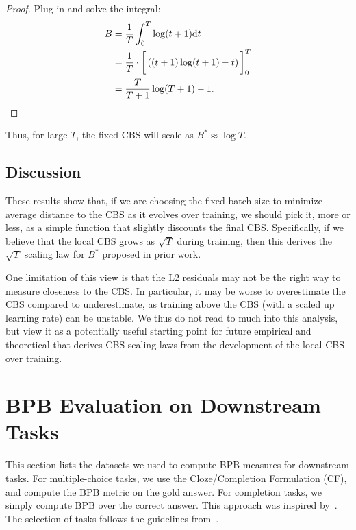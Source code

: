 \begin{proof}
    Plug in and solve the integral:
    \begin{align*}
        B
        &= \frac{1}{T} \int_0^T \log (t + 1) \mathrm{d}t \\
        &= \frac{1}{T} \cdot \bigg[\left((t + 1) \log (t+1) - t \right) \bigg]^T_0 \\
        &= \frac{T}{T + 1} \log (T + 1) - 1 . \qedhere
    \end{align*}
\end{proof}

Thus, for large $T$, the fixed CBS will scale as $B^* \approx \log T$.

\subsection{Discussion}

These results show that, if we are choosing the fixed batch size to minimize average distance to the CBS as it evolves over training, we should pick it, more or less, as a simple function that slightly discounts the final CBS. Specifically, if we believe that the local CBS grows as $\sqrt{T}$ during training, then this derives the $\sqrt{T}$ scaling law for $B^*$ proposed in prior work.

One limitation of this view is that the L2 residuals may not be the right way to measure closeness to the CBS. In particular, it may be worse to overestimate the CBS compared to underestimate, as training above the CBS (with a scaled up learning rate) can be unstable.
We thus do not read to much into this analysis, but view it as a potentially useful starting point for future empirical and theoretical that derives CBS scaling laws from the development of the local CBS over training.

\section{BPB Evaluation on Downstream Tasks} \label{app:bpb}

This section lists the datasets we used to compute BPB measures for downstream tasks.
For multiple-choice tasks, we use the Cloze/Completion Formulation (CF), and compute the BPB metric on the gold
answer.
For completion tasks, we simply compute BPB over the correct answer.
This approach was inspired by~\citet{Bhagia2024EstablishingTS}.
The selection of tasks follows the guidelines from~\citet{DataDecide}.

